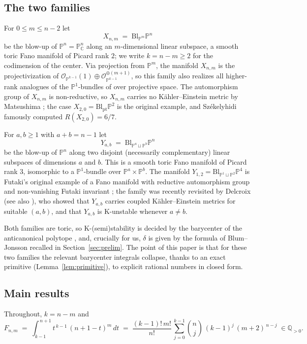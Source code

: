\documentclass[11pt]{amsart}
\theoremstyle{definition}
\theoremstyle{remark}
\newcommand{\PP}{\mathbb{P}}
\newcommand{\QQ}{\mathbb{Q}}
\newcommand{\CC}{\mathbb{C}}
\newcommand{\Bl}{\mathrm{Bl}}
\begin{document}
\subsection*{The two families}
For $0\le m\le n-2$ let
\[
X_{n,m}\;=\;\Bl_{\PP^m}\PP^n
\]
be the blow-up of $\PP^n=\PP^n_{\CC}$ along an $m$-dimensional linear
subspace, a smooth toric Fano manifold of Picard rank $2$; we write
$k=n-m\ge 2$ for the codimension of the center. Via projection from
$\PP^m$, the manifold $X_{n,m}$ is the projectivization of
$\mathcal O_{\PP^{k-1}}(1)\oplus\mathcal O_{\PP^{k-1}}^{\oplus(m+1)}$,
so this family also realizes all higher-rank analogues of the
$\PP^1$-bundles of \cite{ZZ21} over projective space. The automorphism
group of $X_{n,m}$ is non-reductive, so $X_{n,m}$ carries no
K\"ahler--Einstein metric by Matsushima \cite{Matsushima57}; the case
$X_{2,0}=\Bl_{\mathrm{pt}}\PP^2$ is the original example, and
Sz\'ekelyhidi \cite{Szekelyhidi11} famously computed
$R(X_{2,0})=6/7$.

For $a,b\ge 1$ with $a+b=n-1$ let
\[
Y_{a,b}\;=\;\Bl_{\PP^a\sqcup\PP^b}\PP^n
\]
be the blow-up of $\PP^n$ along two disjoint (necessarily
complementary) linear subspaces of dimensions $a$ and $b$. This is a
smooth toric Fano manifold of Picard rank $3$, isomorphic to a
$\PP^1$-bundle over $\PP^a\times\PP^b$. The manifold
$Y_{1,2}=\Bl_{\PP^1\sqcup\PP^2}\PP^4$ is Futaki's original example of a
Fano manifold with reductive automorphism group and non-vanishing
Futaki invariant \cite{Futaki83}; the family was recently revisited by
Delcroix \cite{Delcroix22} (see also \cite{DH21}), who showed that
$Y_{a,b}$ carries coupled K\"ahler--Einstein metrics for suitable
$(a,b)$, and that $Y_{a,b}$ is K-unstable whenever $a\ne b$.

Both families are toric, so K-(semi)stability is decided by the
barycenter of the anticanonical polytope \cite{WZ04,BB13,Berman16},
and, crucially for us, $\delta$ is given by the formula of
Blum--Jonsson \cite[\S 7]{BJ20} recalled in
Section~\ref{sec:prelim}. The point of this paper is that for these
two families the relevant barycenter integrals collapse, thanks to an
exact primitive (Lemma~\ref{lem:primitive}), to explicit rational
numbers in closed form.

\subsection*{Main results}
Throughout, $k=n-m$ and
\begin{equation}\label{eq:F}
F_{n,m}\;=\;\int_{k-1}^{\,n+1} t^{\,k-1}\,(n+1-t)^{m}\,dt
\;=\;\frac{(k-1)!\,m!}{n!}\,
\sum_{j=0}^{k-1}\binom{n}{j}\,(k-1)^{j}\,(m+2)^{\,n-j}\;\in\QQ_{>0}.
\end{equation}
\end{document}
